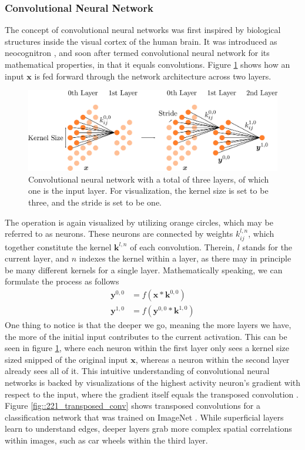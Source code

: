 \subsubsection{Convolutional Neural Network}
The concept of convolutional neural networks was first inspired by biological structures inside the visual cortex of the human brain. It was introduced as neocognitron \cite{fukushima1980neocognitron}, and soon after termed convolutional neural network for its mathematical properties, in that it equals convolutions. Figure \ref{fig::221_convolutional} shows how an input $\bm{x}$ is fed forward through the network architecture across two layers.   
\begin{figure}[h!]
	\centering
	\includegraphics[scale=.28]{chapters/02_background/img/convolutional.png}
	\caption{Convolutional neural network with a total of three layers, of which one is the input layer. For visualization, the kernel size is set to be three, and the stride is set to be one.}
	\label{fig::221_convolutional}
\end{figure}
The operation is again visualized by utilizing orange circles, which may be referred to as neurons. These neurons are connected by weights $k^{l,n}_{ij}$, which together constitute the kernel $\bm{k}^{l,n}$ of each convolution. Therein, $l$ stands for the current layer, and $n$ indexes the kernel within a layer, as there may in principle be many different kernels for a single layer. Mathematically speaking, we can formulate the process as follows
\begin{align}
	\bm{y}^{0,0} &= f(\bm{x}*\bm{k}^{0,0}) \\
	\bm{y}^{1,0} &= f(\bm{y}^{0,0}*\bm{k}^{1,0})	
\end{align}
One thing to notice is that the deeper we go, meaning the more layers we have, the more of the initial input contributes to the current activation. This can be seen in figure \ref{fig::221_convolutional}, where each neuron within the first layer only sees a kernel size sized snipped of the original input $\bm{x}$, whereas a neuron within the second layer already sees all of it. This intuitive understanding of convolutional neural networks is backed by visualizations of the highest activity neuron's gradient with respect to the input, where the gradient itself equals the transposed convolution \cite{simonyan2013deep}.  Figure \ref{fig::221_transposed_conv} shows transposed convolutions for a classification network that was trained on ImageNet \cite{deng2009imagenet}. While superficial layers learn to understand edges, deeper layers grab more complex spatial correlations within images, such as car wheels within the third layer.
